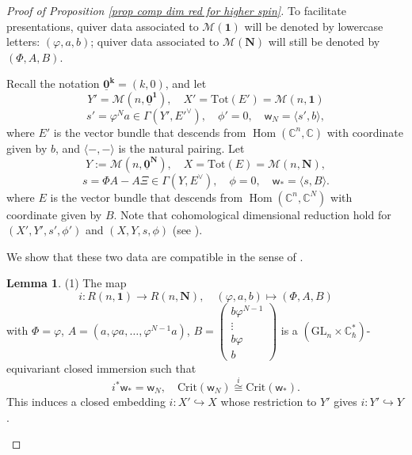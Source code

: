 \documentclass[10pt]{amsart}
\theoremstyle{definition}
\newtheorem{Lemma}[Theorem]{Lemma}
\numberwithin{equation}{section}
\newcommand{\GL}{\mathrm{GL}}
\newcommand{\Crit}{\mathrm{Crit}}
\newcommand{\bC}{\mathbb{C}}
\newcommand{\cM}{\mathcal{M}}
\newcommand{\sw}{\mathsf{w}}
\newcommand{\Hom}{\operatorname{Hom}}
\begin{document}
\begin{proof}[Proof of Proposition \ref{prop comp dim red for higher spin}]

To facilitate presentations, 
quiver data associated to $\cM(\mathbf 1)$ will be denoted by lowercase letters: $(\varphi,a,b)$; quiver data associated to $\cM(\mathbf N)$ will still be denoted by $(\Phi,A,B)$.



Recall the notation $\underline{\mathbf 0}^{\mathbf k}=(k,0)$, and let 
\begin{equation*}
    Y'=\cM(n,\underline{\mathbf 0}^{\mathbf 1}),\quad X'=\mathrm{Tot}(E')= \cM(n,\mathbf 1)
\end{equation*}
$$s'=\varphi^N a\in \Gamma(Y',E'^\vee),\quad \phi'=0,\quad \sw_N=\langle s', b\rangle,$$
where $E'$ is the vector bundle that descends from $\Hom(\bC^n,\bC)$ with coordinate given by $b$, and $\langle-,-\rangle$ is the natural pairing. Let
\begin{equation}
Y:=\cM(n,\underline{\mathbf 0}^{\mathbf N}),\quad X=\mathrm{Tot}(E)= \cM(n,\mathbf N), \end{equation}
$$s=\Phi A-A\Xi \in \Gamma(Y,E^\vee), \quad \phi=0, \quad \sw_*=\langle s, B\rangle. $$
where $E$ is the vector bundle that descends from $\Hom(\bC^n,\bC^N)$ with coordinate given by $B$. Note that cohomological dimensional reduction hold for $(X',Y',s',\phi')$ and $(X,Y,s,\phi)$ (see \cite[Def.~6.1]{COZZ}).

We show that these two data are compatible in the sense of \cite[Def.~6.2]{COZZ}. 
\begin{Lemma}\label{lem on dr higher spin}
(1) The map 
$$i\colon R(n,\mathbf 1) \to R(n,\mathbf N), \quad (\varphi,a,b)\mapsto (\Phi,A,B) $$
with $\Phi=\varphi$, $A=(a,\varphi a,\ldots, \varphi^{N-1}a)$, 
$B=\begin{pmatrix}
b\varphi^{N-1} \\ 
\vdots \\
b\varphi \\
b \end{pmatrix}$ 
is a $(\GL_n\times \bC^*_\hbar)$-equivariant closed immersion such that 
$$i^*\sw_*=\sw_{N}, \quad \Crit(\sw_{N}) \stackrel{i}{\cong} \Crit(\sw_*). $$
This induces a closed embedding $i\colon X' \hookrightarrow X$ whose restriction to $Y'$ gives $i\colon Y' \hookrightarrow Y$.


\end{Lemma}
\end{proof}
\end{document}
